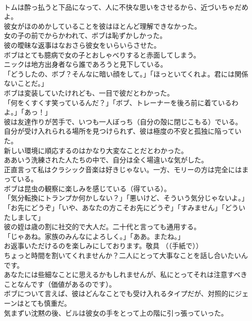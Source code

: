 \documentclass[8pt]{extreport}
\begin{document}
\begin{CJK}{UTF8}{min}
\\	トムは酔っ払うと下品になって、人に不快な思いをさせるから、近づいちゃだめよ。
\\	彼女がほのめかしていることを彼はほとんど理解できなかった。
\\	女の子の前でからかわれて、ボブは恥ずかしかった。
\\	彼の曖昧な返事はなおさら彼女をいらいらさせた。
\\	ボブはとても臆病で女の子とおしゃべりすると赤面してしまう。
\\	ニックは地方出身者なら誰であろうと見下している。
\\	「どうしたの、ボブ？そんなに暗い顔をして。」「ほっといてくれよ。君には関係ないことだ。」
\\	ボブは変装していたけれども、一目で彼だとわかった。
\\	「何をくすくす笑っているんだ？」「ボブ、トレーナーを後ろ前に着ているわよ。」「あっ！」
\\	彼は友達作りが苦手で、いつも一人ぼっち（自分の殻に閉じこもる）でいる。
\\	自分が受け入れられる場所を見つけられず、彼は極度の不安と孤独に陥っていた。
\\	新しい環境に順応するのはかなり大変なことだとわかった。
\\	ああいう洗練された人たちの中で、自分は全く場違いな気がした。
\\	正直言って私はクラシック音楽は好きじゃない。一方、モリーの方は完全にはまっている。
\\	ボブは昆虫の観察に楽しみを感じている（得ている）。
\\	「気分転換にトランプか何かしない？」「悪いけど、そういう気分じゃないよ。」
\\	「お先にどうぞ」「いや、あなたの方こそお先にどうぞ」「すみません」「どういたしまして」
\\	彼の姪は歳の割に社交的で大人だ。二十代と言っても通用する。
\\	「じゃあね。家族のみんなによろしく。」「ああ。またね。」
\\	お返事いただけるのを楽しみにしております。敬具 （（手紙で））
\\	ちょっと時間を割いてくれませんか？二人にとって大事なことを話し合いたいんです。
\\	あなたには些細なことに思えるかもしれませんが、私にとってそれは注意すべきことなんです（価値があるのです）。
\\	ボブについて言えば、彼はどんなことでも受け入れるタイプだが、対照的にジェーンはとても慎重だ。
\\	気まずい沈黙の後、ビルは彼女の手をとって上の階に引っ張っていった。

\end{CJK}
\end{document}
